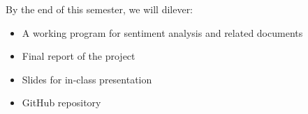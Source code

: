 \documentclass[conference]{IEEEtran}
\begin{document}
    By the end of this semester, we will dilever:
    \begin{itemize}
    \item A working program for sentiment analysis and related documents
    \item Final report of the project
    \item Slides for in-class presentation
    \item GitHub repository
    \end{itemize}



\end{document}
